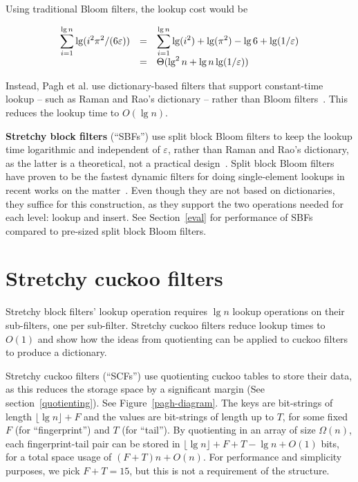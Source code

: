 \documentclass[letterpaper,twocolumn,10pt]{article}
\newcommand{\etal}{et al.}
\newcommand{\Taffy}{Stretchy}
\newcommand{\TBF}{SBF}
\newcommand{\TCF}{SCF}
\newcommand{\Taffy}{Taffy}
\newcommand{\TBF}{TBF}
\newcommand{\TCF}{TCF}
\begin{document}
Using traditional Bloom filters, the lookup cost would be

\[
\begin{array}{r c l}
\displaystyle\sum_{i=1}^{\lg n} \lg (i^2 \pi^2 /(6 \varepsilon)) & = &
 \displaystyle\sum_{i=1}^{\lg n} \lg (i^2) + \lg( \pi^2) - \lg 6 + \lg (1/\varepsilon) \\
& = & \Theta(\lg^2 n + \lg n \lg (1/\varepsilon))
\end{array}
\]

Instead, Pagh \etal{} use dictionary-based filters that support constant-time lookup -- such as Raman and Rao's dictionary -- rather than Bloom filters~\cite{succinct,psw}.
This reduces the lookup time to $O(\lg n)$.

{\bf \Taffy{} block filters} (``\TBF{}s'') use split block Bloom filters to keep the lookup time logarithmic and independent of $\varepsilon$, rather than Raman and Rao's dictionary, as the latter is a theoretical, not a practical design~\cite{psw,succinct}.
Split block Bloom filters have proven to be the fastest dynamic filters for doing single-element lookups in recent works on the matter~\cite{overtakes,ribbon,bloom-simd}.
Even though they are not based on dictionaries, they suffice for this construction, as they support the two operations needed for each level: lookup and insert.
See Section~\ref{eval} for performance of \TBF{}s compared to pre-sized split block Bloom filters.


\section{\Taffy{} cuckoo filters}
\label{tcf}

\Taffy{} block filters' lookup operation requires $\lg n$ lookup operations on their sub-filters, one per sub-filter.
\Taffy{} cuckoo filters reduce lookup times to $O(1)$ and show how the ideas from quotienting can be applied to cuckoo filters to produce a dictionary.

\Taffy{} cuckoo filters (``\TCF{}s'') use quotienting cuckoo tables %
to store their data, as this reduces the storage space by a significant margin (See section~\ref{quotienting}).
See Figure~\ref{pagh-diagram}.
The keys are bit-strings of length $\lfloor \lg n \rfloor + F$ and the values are bit-strings of length up to $T$, for some fixed $F$ (for ``fingerprint'') and $T$ (for ``tail'').
By quotienting in an array of size $\Omega(n)$, each fingerprint-tail pair can be stored in $\lfloor \lg n \rfloor + F + T - \lg n + O(1)$ bits, for a total space usage of $(F+T)n + O(n)$.
For performance and simplicity purposes, we pick $F + T = 15$, but this is not a requirement of the structure.
\end{document}
